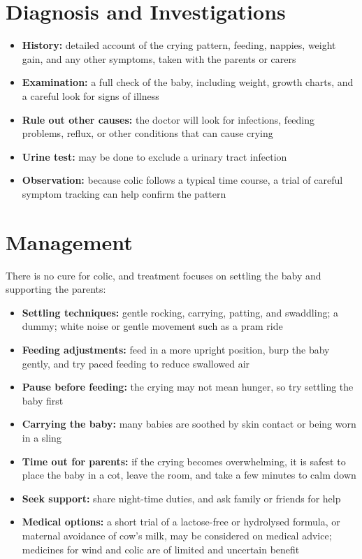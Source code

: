 \section*{Diagnosis and Investigations}
\begin{itemize}
    \item \textbf{History:} detailed account of the crying pattern, feeding, nappies, weight gain, and any other symptoms, taken with the parents or carers
    \item \textbf{Examination:} a full check of the baby, including weight, growth charts, and a careful look for signs of illness
    \item \textbf{Rule out other causes:} the doctor will look for infections, feeding problems, reflux, or other conditions that can cause crying
    \item \textbf{Urine test:} may be done to exclude a urinary tract infection
    \item \textbf{Observation:} because colic follows a typical time course, a trial of careful symptom tracking can help confirm the pattern
\end{itemize}

\section*{Management}
There is no cure for colic, and treatment focuses on settling the baby and supporting the parents:

\begin{itemize}
    \item \textbf{Settling techniques:} gentle rocking, carrying, patting, and swaddling; a dummy; white noise or gentle movement such as a pram ride
    \item \textbf{Feeding adjustments:} feed in a more upright position, burp the baby gently, and try paced feeding to reduce swallowed air
    \item \textbf{Pause before feeding:} the crying may not mean hunger, so try settling the baby first
    \item \textbf{Carrying the baby:} many babies are soothed by skin contact or being worn in a sling
    \item \textbf{Time out for parents:} if the crying becomes overwhelming, it is safest to place the baby in a cot, leave the room, and take a few minutes to calm down
    \item \textbf{Seek support:} share night-time duties, and ask family or friends for help
    \item \textbf{Medical options:} a short trial of a lactose-free or hydrolysed formula, or maternal avoidance of cow's milk, may be considered on medical advice; medicines for wind and colic are of limited and uncertain benefit
\end{itemize}

